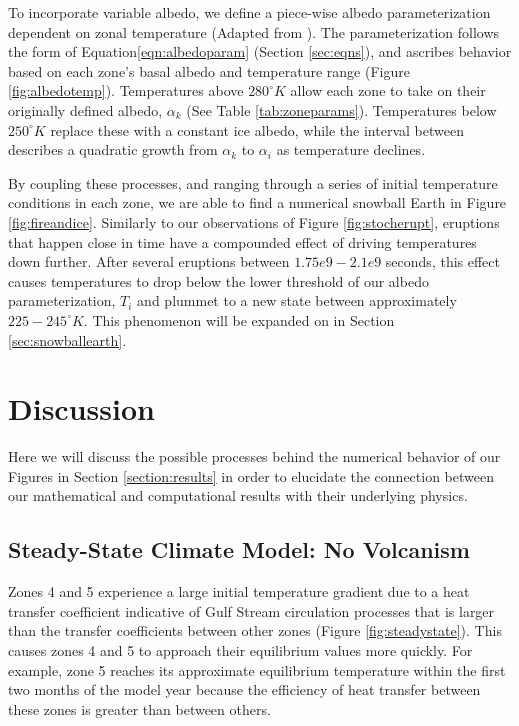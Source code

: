 \documentclass[12pt]{article}
\begin{document}
To incorporate variable albedo, we define a piece-wise albedo parameterization
dependent on zonal temperature (Adapted from \cite{jellinek_ps}).
The parameterization follows the form of Equation\ref{eqn:albedoparam}
(Section \ref{sec:eqns}), and ascribes behavior based on each zone's basal
albedo and temperature range (Figure \ref{fig:albedotemp}). Temperatures above
$280^{\circ}K$ allow each zone to take on their originally defined albedo,
$\alpha_k$ (See Table \ref{tab:zoneparams}). Temperatures below $250^{\circ}K$
replace these with a constant ice albedo, while the interval between describes a
quadratic growth from $\alpha_k$ to $\alpha_i$ as temperature declines.

By coupling these processes, and ranging through a series of initial temperature
conditions in each zone, we are able to find a numerical snowball Earth in
Figure \ref{fig:fireandice}. Similarly to our observations of Figure
\ref{fig:stocherupt}, eruptions that happen close in time have a compounded
effect of driving temperatures down further. After several eruptions between
$1.75e9-2.1e9$ seconds, this effect causes temperatures to drop below the lower
threshold of our albedo parameterization, $T_i$ and plummet to a new state
between approximately $225-245^{\circ}K$. This phenomenon will be expanded on
in Section \ref{sec:snowballearth}.

\section{Discussion}
Here we will discuss the possible processes behind the numerical behavior of our
Figures in Section \ref{section:results} in order to elucidate the connection
between our mathematical and computational results with their underlying
physics.

\subsection{Steady-State Climate Model: No Volcanism}
\label{section:steadystate}
Zones 4 and 5 experience a large initial temperature gradient due to a heat
transfer coefficient indicative of Gulf Stream circulation processes that is
larger than the transfer coefficients between other zones
(Figure \ref{fig:steadystate}). This causes zones 4 and 5 to approach their
equilibrium values more quickly. For example, zone 5 reaches its approximate
equilibrium temperature within the first two months of the model year because
the efficiency of heat transfer between these zones is greater than between
others. \\
\end{document}
